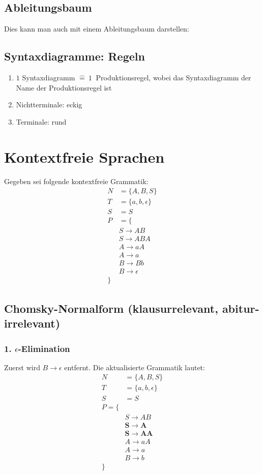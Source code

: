 \subsection{Ableitungsbaum}
Dies kann man auch mit einem Ableitungsbaum darstellen:
\subsection{Syntaxdiagramme: Regeln}
\begin{enumerate}
    \item $1$ Syntaxdiagramm $\hat{=}\ 1\ $ Produktionsregel, wobei das Syntaxdiagramm der Name der Produktionsregel ist
    \item Nichtterminale: eckig
    \item Terminale: rund
\end{enumerate}

\section{Kontextfreie Sprachen}
Gegeben sei folgende kontextfreie Grammatik:
\begin{align*}
    N&=\{A,B,S\}\\
    T&=\{a,b,\epsilon\}\\
    S&=S\\
    P&=\{\\
        &S\to AB\\
        &S\to ABA\\
        &A\to aA\\
        &A\to a\\
        &B\to Bb\\
        &B\to \epsilon\\
    \}
\end{align*}
\subsection{Chomsky-Normalform (klausurrelevant, abitur-irrelevant)}
\label{cnf}
\subsubsection{1. $\epsilon$-Elimination}
Zuerst wird $B\to \epsilon$ entfernt. Die aktualisierte Grammatik lautet:
\begin{align*}
    N&=\{A,B,S\}\\
    T&=\{a,b,\epsilon\}\\
    S&=S\\
    P=\{\\
    &S\to AB\\
    &\mathbf{S\to A}\\
    &\mathbf{S\to AA}\\
    &A\to aA\\
    &A\to a\\
    &B\to b\\
    \}
\end{align*}
